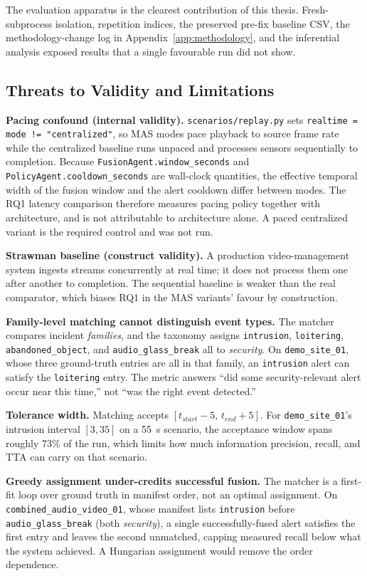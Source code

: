 The evaluation apparatus is the clearest contribution of this thesis. Fresh-subprocess isolation, repetition indices, the preserved pre-fix baseline CSV, the methodology-change log in Appendix~\ref{app:methodology}, and the inferential analysis exposed results that a single favourable run did not show.

\subsection{Threats to Validity and Limitations}
\label{sec:threats}

\textbf{Pacing confound (internal validity).} \texttt{scenarios/replay.py} sets \texttt{realtime = mode != "centralized"}, so MAS modes pace playback to source frame rate while the centralized baseline runs unpaced and processes sensors sequentially to completion. Because \texttt{FusionAgent.window\_seconds} and \texttt{PolicyAgent.cooldown\_seconds} are wall-clock quantities, the effective temporal width of the fusion window and the alert cooldown differ between modes. The RQ1 latency comparison therefore measures pacing policy together with architecture, and is not attributable to architecture alone. A paced centralized variant is the required control and was not run.

\textbf{Strawman baseline (construct validity).} A production video-management system ingests streams concurrently at real time; it does not process them one after another to completion. The sequential baseline is weaker than the real comparator, which biases RQ1 in the MAS variants' favour by construction.

\textbf{Family-level matching cannot distinguish event types.} The matcher compares incident \emph{families}, and the taxonomy assigns \texttt{intrusion}, \texttt{loitering}, \texttt{abandoned\_object}, and \texttt{audio\_glass\_break} all to \emph{security}. On \texttt{demo\_site\_01}, whose three ground-truth entries are all in that family, an \texttt{intrusion} alert can satisfy the \texttt{loitering} entry. The metric answers ``did some security-relevant alert occur near this time,'' not ``was the right event detected.''

\textbf{Tolerance width.} Matching accepts $[t_{start}-5,\,t_{end}+5]$. For \texttt{demo\_site\_01}'s intrusion interval $[3,35]$ on a 55~s scenario, the acceptance window spans roughly 73\% of the run, which limits how much information precision, recall, and TTA can carry on that scenario.

\textbf{Greedy assignment under-credits successful fusion.} The matcher is a first-fit loop over ground truth in manifest order, not an optimal assignment. On \texttt{combined\_audio\_video\_01}, whose manifest lists \texttt{intrusion} before \texttt{audio\_glass\_break} (both \emph{security}), a single successfully-fused alert satisfies the first entry and leaves the second unmatched, capping measured recall below what the system achieved. A Hungarian assignment would remove the order dependence.

